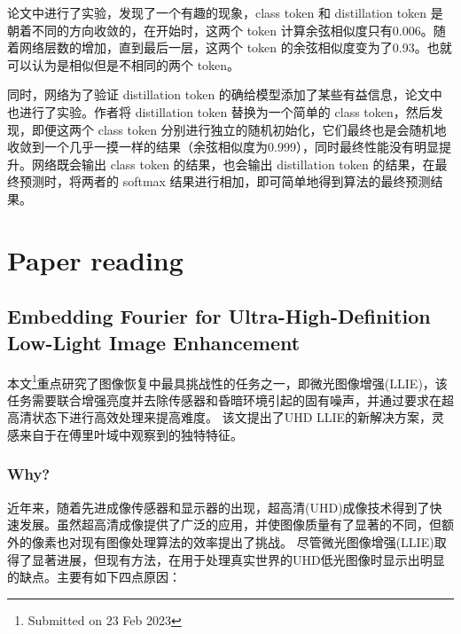 \documentclass[letterpaper,10pt]{article}
\begin{document}
	论文中进行了实验，发现了一个有趣的现象，class token 和 distillation token 是朝着不同的方向收敛的，在开始时，这两个 token 计算余弦相似度只有0.006。随着网络层数的增加，直到最后一层，这两个 token 的余弦相似度变为了0.93。也就可以认为是相似但是不相同的两个 token。
	
	同时，网络为了验证 distillation token 的确给模型添加了某些有益信息，论文中也进行了实验。作者将 distillation token 替换为一个简单的 class token，然后发现，即便这两个 class token 分别进行独立的随机初始化，它们最终也是会随机地收敛到一个几乎一摸一样的结果（余弦相似度为0.999），同时最终性能没有明显提升。网络既会输出 class token 的结果，也会输出 distillation token 的结果，在最终预测时，将两者的 softmax 结果进行相加，即可简单地得到算法的最终预测结果。
	

	
	\section{Paper reading}
	
	\subsection{Embedding Fourier for Ultra-High-Definition Low-Light Image Enhancement}
	
	本文\footnote{Submitted on 23 Feb 2023}重点研究了图像恢复中最具挑战性的任务之一，即微光图像增强(LLIE)，该任务需要联合增强亮度并去除传感器和昏暗环境引起的固有噪声，并通过要求在超高清状态下进行高效处理来提高难度。
	该文提出了UHD LLIE的新解决方案，灵感来自于在傅里叶域中观察到的独特特征。
	
	\subsubsection{Why?}
	
	近年来，随着先进成像传感器和显示器的出现，超高清(UHD)成像技术得到了快速发展。虽然超高清成像提供了广泛的应用，并使图像质量有了显著的不同，但额外的像素也对现有图像处理算法的效率提出了挑战。
	尽管微光图像增强(LLIE)取得了显著进展，但现有方法，在用于处理真实世界的UHD低光图像时显示出明显的缺点。主要有如下四点原因：
	
\end{document}
